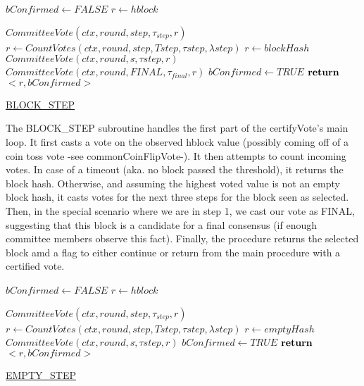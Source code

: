 \documentclass[10pt,a4paper]{article}
\begin{document}
\begin{algorithm}
    \begin{algorithmic}[H]
        \State $bConfirmed \gets FALSE$
        \State $r \gets hblock$

        \State $CommitteeVote(ctx, round, step, \tau_{step}, r)$
        \State $r \gets CountVotes(ctx,round,step,Tstep,\tau step,\lambda step)$
            \State $r \gets blockHash$
                \State $CommitteeVote(ctx, round, s\tilde, \tau step, r)$
            \EndFor
                \State $CommitteeVote(ctx, round, FINAL, \tau_{final}, r)$
            \EndIf
            \State $bConfirmed \gets TRUE$
        \EndIf
        $\Return$ $<r, bConfirmed>$
    \EndFunction
    \end{algorithmic}
    \caption{\underline{BLOCK\_STEP}}
\end{algorithm}

The BLOCK\_STEP subroutine handles the first part of the certifyVote's main loop.
It first casts a vote on the observed hblock value (possibly coming off of a coin toss vote -see commonCoinFlipVote-).
It then attempts to count incoming votes. In case of a timeout (aka. no block passed the threshold), it returns the block hash.
Otherwise, and assuming the highest voted value is not an empty block hash, it casts votes for the next three steps for the block seen as selected.
Then, in the special scenario where we are in step 1, we cast our vote as FINAL, suggesting that this block is a candidate for a final consensus (if enough committee members observe this fact).
Finally, the procedure returns the selected block amd a flag to either continue or return from the main procedure with a certified vote.


\begin{algorithm}
    \begin{algorithmic}[H]
        \State $bConfirmed \gets FALSE$
        \State $r \gets hblock$

    \State $CommitteeVote(ctx, round, step, \tau_{step}, r)$
    \State $r \gets CountVotes(ctx,round,step,Tstep,\tau step,\lambda step)$
        \State $r \gets emptyHash$
            \State $CommitteeVote(ctx, round, s\tilde, \tau step, r)$
        \EndFor
        \State $bConfirmed \gets TRUE$
    \EndIf
    $\Return$ $<r, bConfirmed>$
    \EndFunction
    \end{algorithmic}
    \caption{\underline{EMPTY\_STEP}}
\end{algorithm}
\end{document}
